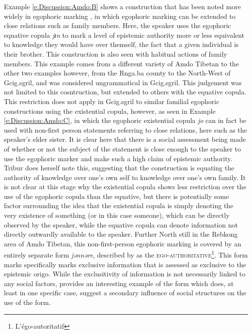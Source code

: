 Example \ref{e:Discussion:Amdo:B} shows a construction that has been noted more widely in egophoric marking \cite{EgoIntro}, in which egophoric marking can be extended to close relations such as family members. Here, the speaker uses the egophoric equative copula \textit{jɪn} to mark a level of epistemic authority more or less equivalent to knowledge they would have over themself, the fact that a given individual is their brother. This construction is also seen with habitual actions of family members. This example comes from a different variety of Amdo Tibetan to the other two examples however, from the Rnga.ba county to the North-West of Gcig.sgril, and was considered ungrammatical in Gcig.sgril. This judgement was not limited to this cosntruction, but extended to others with the equative copula. This restriction does not apply in Gcig.sgril to similar familial egophoric constructions using the existential copula, however, as seen in Example \ref{e:Discussion:Amdo:C}, in which the egophoric existential copula \textit{jo} can in fact be used with non-first person statements referring to close relations, here such as the speaker's elder sister. It is clear here that there is a social assessment being made of whether or not the subject of the statement is close enough to the speaker to use the egophoric marker and make such a high claim of epistemic authority. Tribur does herself note this, suggesting that the construction is equating the authority of knowledge over one's own self to knowledge over one's own family. It is not clear at this stage why the existential copula shows less restriction over the use of the egophoric copula than the equative, but there is potentially some factor surrounding the idea that the existential copula is simply denoting the very existence of something (or in this case someone), which can be directly observed by the speaker, while the equative copula can denote information not directly outwardly available to the speaker. Further North still in the Rebkong area of Amdo Tibetan, this non-first-person egophoric marking is covered by an entirely separate form \textit{jənnəre}, described by  as the \textsc{ego-authoritative}\footnote{L'égo-autoritatif}. This form marks specifically marks exclusive information that is assessed as exclusive to the epistemic origo. While the exclusitivity of information is not necessarily linked to any social factors,  provides an interesting example of the form which does, at least in one specific case, suggest a secondary influence of social structures on the use of the form.

